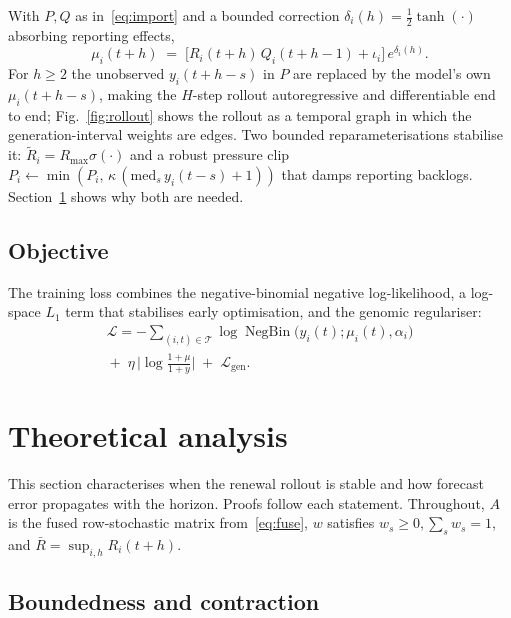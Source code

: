 \documentclass[conference]{IEEEtran}
\DeclareMathOperator{\NB}{NegBin}
\begin{document}
With $P,Q$ as in~\eqref{eq:import} and a bounded correction $\delta_i(h)=\frac{1}{2}\tanh(\cdot)$ absorbing reporting effects,
\begin{equation}
\mu_i(t+h) \;=\; \big[R_i(t+h)\,Q_i(t+h-1) + \iota_i\big]\,e^{\delta_i(h)} .
\label{eq:mu}
\end{equation}
For $h\geq2$ the unobserved $y_i(t+h-s)$ in $P$ are replaced by the model's own $\mu_i(t+h-s)$, making the $H$-step rollout autoregressive and differentiable end to end; Fig.~\ref{fig:rollout} shows the rollout as a temporal graph in which the generation-interval weights are edges. Two bounded reparameterisations stabilise it: $\tilde R_i = R_{\max}\sigma(\cdot)$ and a robust pressure clip $P_i \leftarrow \min(P_i,\,\kappa\,(\mathrm{med}_s\, y_i(t-s)+1))$ that damps reporting backlogs. Section~\ref{sec:theory} shows why both are needed.

\subsection{Objective}

The training loss combines the negative-binomial negative log-likelihood, a log-space $L_1$ term that stabilises early optimisation, and the genomic regulariser:
\begin{equation}
\begin{aligned}
\mathcal{L} = -\!\!\sum_{(i,t)\in\mathcal{T}}\!\!\log \NB\big(y_i(t);\mu_i(t),\alpha_i\big)\\[2pt]
{}+\;\eta\,\Big|\log\tfrac{1+\mu}{1+y}\Big| \;+\; \mathcal{L}_{\mathrm{gen}}.
\end{aligned}
\label{eq:loss}
\end{equation}

\section{Theoretical analysis}\label{sec:theory}

This section characterises when the renewal rollout is stable and how forecast error propagates with the horizon. Proofs follow each statement. Throughout, $A$ is the fused row-stochastic matrix from~\eqref{eq:fuse}, $w$ satisfies $w_s\geq0,\sum_s w_s=1$, and $\bar R=\sup_{i,h}R_i(t+h)$.

\subsection{Boundedness and contraction}
\end{document}

